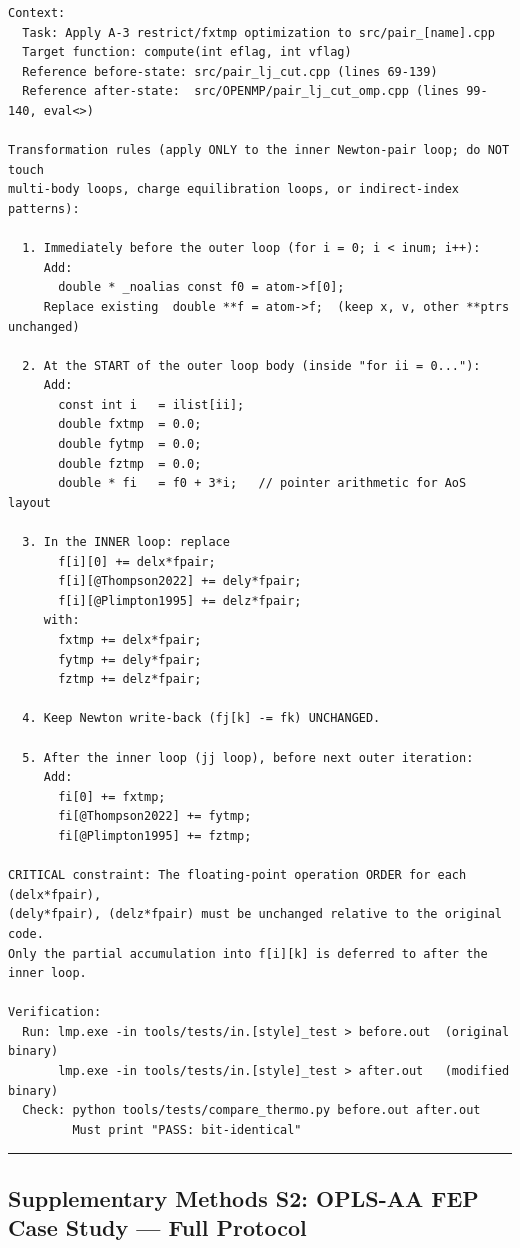 \documentclass[
  11pt,
]{article}
\begin{document}
\begin{verbatim}
Context:
  Task: Apply A-3 restrict/fxtmp optimization to src/pair_[name].cpp
  Target function: compute(int eflag, int vflag)
  Reference before-state: src/pair_lj_cut.cpp (lines 69-139)
  Reference after-state:  src/OPENMP/pair_lj_cut_omp.cpp (lines 99-140, eval<>)

Transformation rules (apply ONLY to the inner Newton-pair loop; do NOT touch
multi-body loops, charge equilibration loops, or indirect-index patterns):

  1. Immediately before the outer loop (for i = 0; i < inum; i++):
     Add:
       double * _noalias const f0 = atom->f[0];
     Replace existing  double **f = atom->f;  (keep x, v, other **ptrs unchanged)

  2. At the START of the outer loop body (inside "for ii = 0..."):
     Add:
       const int i   = ilist[ii];
       double fxtmp  = 0.0;
       double fytmp  = 0.0;
       double fztmp  = 0.0;
       double * fi   = f0 + 3*i;   // pointer arithmetic for AoS layout

  3. In the INNER loop: replace
       f[i][0] += delx*fpair;
       f[i][@Thompson2022] += dely*fpair;
       f[i][@Plimpton1995] += delz*fpair;
     with:
       fxtmp += delx*fpair;
       fytmp += dely*fpair;
       fztmp += delz*fpair;

  4. Keep Newton write-back (fj[k] -= fk) UNCHANGED.

  5. After the inner loop (jj loop), before next outer iteration:
     Add:
       fi[0] += fxtmp;
       fi[@Thompson2022] += fytmp;
       fi[@Plimpton1995] += fztmp;

CRITICAL constraint: The floating-point operation ORDER for each (delx*fpair),
(dely*fpair), (delz*fpair) must be unchanged relative to the original code.
Only the partial accumulation into f[i][k] is deferred to after the inner loop.

Verification:
  Run: lmp.exe -in tools/tests/in.[style]_test > before.out  (original binary)
       lmp.exe -in tools/tests/in.[style]_test > after.out   (modified binary)
  Check: python tools/tests/compare_thermo.py before.out after.out
         Must print "PASS: bit-identical"
\end{verbatim}

\begin{center}\rule{0.5\linewidth}{0.5pt}\end{center}

\subsection{Supplementary Methods S2: OPLS-AA FEP Case Study --- Full
Protocol}\label{supplementary-methods-s2-opls-aa-fep-case-study-full-protocol}
\end{document}
